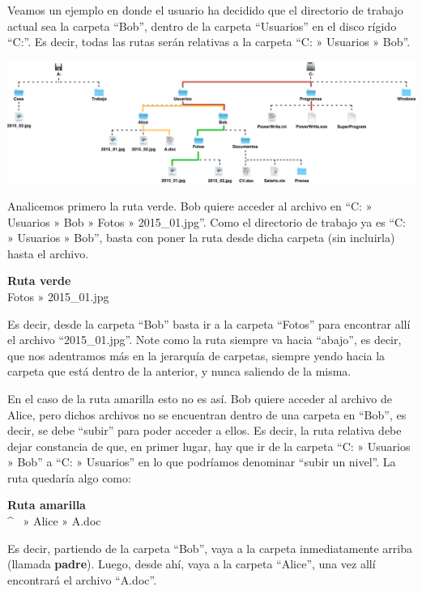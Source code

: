 Veamos un ejemplo en donde el usuario ha decidido que el directorio de trabajo
actual sea la carpeta ``Bob'', dentro de la carpeta ``Usuarios'' en el disco
rígido ``C:''. Es decir, todas las rutas serán relativas a la carpeta ``C: »
Usuarios » Bob''.

\vspace{0.5cm}
\centerline{\includegraphics[scale=0.35]{unidades/2_informacion/2_informatica/imagenes/directorios_windows_3.png}}

Analicemos primero la ruta verde. Bob quiere acceder al archivo en ``C: »
Usuarios » Bob » Fotos » 2015\_01.jpg''. Como el directorio de trabajo ya es
``C: » Usuarios » Bob'', basta con poner la ruta desde dicha carpeta (sin
incluirla) hasta el archivo.

\begin{example}
    \textbf{Ruta verde}\\
    Fotos » 2015\_01.jpg
\end{example}

Es decir, desde la carpeta ``Bob'' basta ir a la carpeta ``Fotos'' para
encontrar allí el archivo ``2015\_01.jpg''. Note como la ruta siempre va hacia
``abajo'', es decir, que nos adentramos más en la jerarquía de carpetas, siempre
yendo hacia la carpeta que está dentro de la anterior, y nunca saliendo de la
misma.

En el caso de la ruta amarilla esto no es así. Bob quiere acceder al archivo de
Alice, pero dichos archivos no se encuentran dentro de una carpeta en ``Bob'',
es decir, se debe ``subir'' para poder acceder a ellos. Es decir, la ruta
relativa debe dejar constancia de que, en primer lugar, hay que ir de la carpeta
``C: » Usuarios » Bob'' a ``C: » Usuarios'' en lo que podríamos denominar
``subir un nivel''. La ruta quedaría algo como:

\begin{example}
    \textbf{Ruta amarilla}\\
    \textasciicircum ~ » Alice » A.doc
\end{example}

Es decir, partiendo de la carpeta ``Bob'', vaya a la carpeta inmediatamente
arriba (llamada \textbf{padre}). Luego, desde ahí, vaya a la carpeta ``Alice'',
una vez allí encontrará el archivo ``A.doc''.


